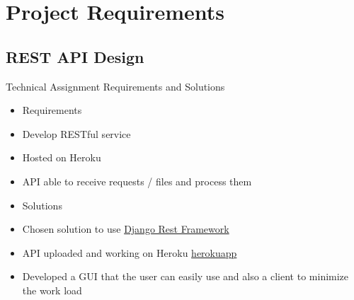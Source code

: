 \section{Project Requirements}
\label{sec:restApi}

\subsection{REST API Design}
  
\begin{frame}
  \begin{exampleblock}{Technical Assignment Requirements and Solutions}
    \begin{itemize}
      \item Requirements
      \item<1-| alert@1> Develop RESTful service
      \item<2-| alert@2> Hosted on Heroku
      \item<3-| alert@3> API able to receive requests / files and process them
      \item Solutions
      \item<1-| alert@1> Chosen solution to use \alert{\href{http://www.django-rest-framework.org}{Django Rest Framework}~\cite{djangoRestFramework}}
      \item<2-| alert@2> API uploaded and working on Heroku \alert{\href{https://thanos-test.herokuapp.com/}{herokuapp}~\cite{herokuApi}}
      \item<3-| alert@3> Developed a GUI that the user can easily use and also a client to minimize the work load
    \end{itemize}
  \end{exampleblock}
\end{frame}
